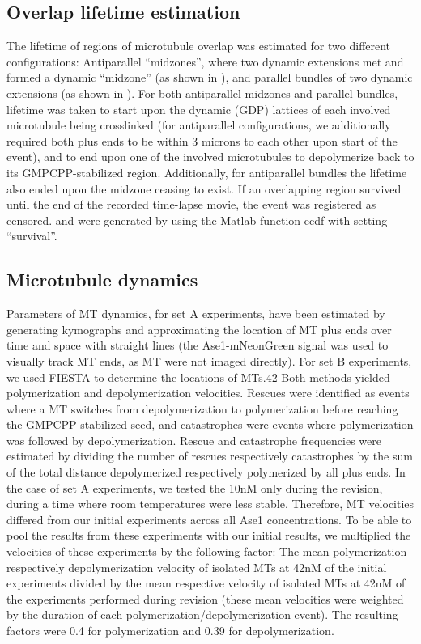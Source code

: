 \subsection{Overlap lifetime estimation}
The lifetime of regions of microtubule overlap was estimated for two different configurations: Antiparallel “midzones”, where two dynamic extensions met and formed a dynamic “midzone” (as shown in ), and parallel bundles of two dynamic extensions (as shown in ). For both antiparallel midzones and parallel bundles, lifetime was taken to start upon the dynamic (GDP) lattices of each involved microtubule being crosslinked (for antiparallel configurations, we additionally required both plus ends to be within 3 microns to each other upon start of the event), and to end upon one of the involved microtubules to depolymerize back to its GMPCPP-stabilized region. Additionally, for antiparallel bundles the lifetime also ended upon the midzone ceasing to exist. If an overlapping region survived until the end of the recorded time-lapse movie, the event was registered as censored.  and  were generated by using the Matlab function ecdf with setting “survival”.

\subsection{Microtubule dynamics}
Parameters of MT dynamics, for set A experiments, have been estimated by generating kymographs and approximating the location of MT plus ends over time and space with straight lines (the Ase1-mNeonGreen signal was used to visually track MT ends, as MT were not imaged directly). For set B experiments, we used FIESTA to determine the locations of MTs.42 Both methods yielded polymerization and depolymerization velocities. Rescues were identified as events where a MT switches from depolymerization to polymerization before reaching the GMPCPP-stabilized seed, and catastrophes were events where polymerization was followed by depolymerization. Rescue and catastrophe frequencies were estimated by dividing the number of rescues respectively catastrophes by the sum of the total distance depolymerized respectively polymerized by all plus ends. In the case of set A experiments, we tested the 10nM only during the revision, during a time where room temperatures were less stable. Therefore, MT velocities differed from our initial experiments across all Ase1 concentrations. To be able to pool the results from these experiments with our initial results, we multiplied the velocities of these experiments by the following factor: The mean polymerization respectively depolymerization velocity of isolated MTs at 42nM of the initial experiments divided by the mean respective velocity of isolated MTs at 42nM of the experiments performed during revision (these mean velocities were weighted by the duration of each polymerization/depolymerization event). The resulting factors were 0.4 for polymerization and 0.39 for depolymerization.

